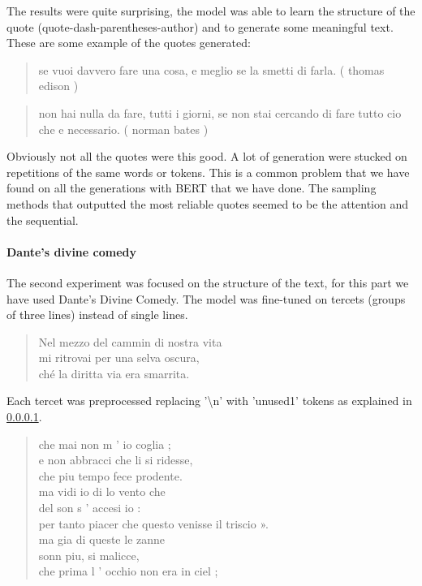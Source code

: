 \documentclass[10pt,twocolumn,letterpaper]{article}
\begin{document}
The results were quite surprising, the model was able to learn the structure of the quote (quote-dash-parentheses-author)
and to generate some meaningful text. These are some example of the quotes generated:

\begin{quote}
   se vuoi davvero fare una cosa, e meglio se la smetti di farla. ( thomas edison )
\end{quote}
\begin{quote}
non hai nulla da fare, tutti i giorni, se non stai cercando di fare tutto cio che e necessario. ( norman bates )
\end{quote}

Obviously not all the quotes were this good. A lot of generation were stucked on repetitions of the same words or tokens.
This is a common problem that we have found on all the generations with BERT that we have done.
The sampling methods that outputted the most reliable quotes seemed to be the attention and the sequential.

\paragraph{Dante's divine comedy} The second experiment was focused on the structure of the text,
for this part we have used Dante's Divine Comedy. The model was fine-tuned on tercets (groups of three lines) instead of single lines.
\begin{quote}
   Nel mezzo del cammin di nostra vita\\
   mi ritrovai per una selva oscura,\\
   ché la diritta via era smarrita.\\
\end{quote}
Each tercet was preprocessed replacing '\textbackslash n' with 'unused1' tokens as explained in \ref{}.


\begin{quote}
 che mai non m ’ io coglia ;\\
 e non abbracci che li si ridesse,\\
 che piu tempo fece prodente.\\


 ma vidi io di lo vento che\\
 del son s ’ accesi io :\\
 per tanto piacer che questo venisse il triscio ».\\


 ma gia di queste le zanne\\
 sonn piu, si malicce,\\
 che prima l ’ occhio non era in ciel ;\\

\end{quote}
\end{document}
